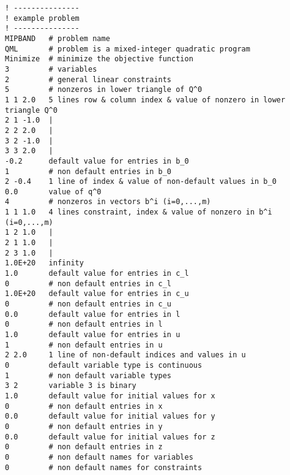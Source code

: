 {\small
\begin{verbatim}
! ---------------
! example problem
! ---------------
MIPBAND   # problem name
QML       # problem is a mixed-integer quadratic program
Minimize  # minimize the objective function
3         # variables
2         # general linear constraints
5         # nonzeros in lower triangle of Q^0
1 1 2.0   5 lines row & column index & value of nonzero in lower triangle Q^0
2 1 -1.0  |
2 2 2.0   |
3 2 -1.0  |
3 3 2.0   |
-0.2      default value for entries in b_0
1         # non default entries in b_0
2 -0.4    1 line of index & value of non-default values in b_0
0.0       value of q^0
4         # nonzeros in vectors b^i (i=0,...,m)
1 1 1.0   4 lines constraint, index & value of nonzero in b^i (i=0,...,m)
1 2 1.0   |
2 1 1.0   |
2 3 1.0   |
1.0E+20   infinity
1.0       default value for entries in c_l
0         # non default entries in c_l
1.0E+20   default value for entries in c_u
0         # non default entries in c_u
0.0       default value for entries in l
0         # non default entries in l
1.0       default value for entries in u
1         # non default entries in u
2 2.0     1 line of non-default indices and values in u
0         default variable type is continuous
1         # non default variable types
3 2       variable 3 is binary
1.0       default value for initial values for x
0         # non default entries in x
0.0       default value for initial values for y
0         # non default entries in y
0.0       default value for initial values for z
0         # non default entries in z
0         # non default names for variables
0         # non default names for constraints
\end{verbatim}
}
